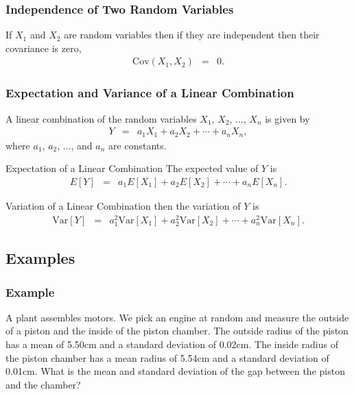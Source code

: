 \begin{frame}
  \frametitle{Independence of Two Random Variables}

    If $X_1$ and $X_2$ are random variables then if they are independent
    then their covariance is zero,
    \begin{eqnarray*}
      \mathrm{Cov}(X_1,X_2) & = & 0.
    \end{eqnarray*}
  
\end{frame}

\begin{frame}
  \frametitle{Expectation and Variance of a Linear Combination}

  A linear combination of the random variables $X_1$, $X_2$, $\ldots$,
  $X_n$ is given by
  \begin{eqnarray*}
    Y & = & a_1 X_1 + a_2 X_2 + \cdots + a_n X_n,
  \end{eqnarray*}
  where $a_1$, $a_2$, $\ldots$, and $a_n$ are constants.


  \begin{block}{Expectation of a Linear Combination}
    The expected value of $Y$ is 
    \begin{eqnarray*}
      E[Y] & = & a_1 E[X_1] + a_2 E[X_2] + \cdots + a_n E[X_n].
    \end{eqnarray*}
  \end{block}

  \begin{block}{Variation of a Linear Combination}
     then the
    variation of $Y$ is
    \begin{eqnarray*}
      \mathrm{Var}[Y] & = & a_1^2 \mathrm{Var}[X_1] + a_2^2 \mathrm{Var}[X_2] + \cdots + a_n^2 \mathrm{Var}[X_n].
    \end{eqnarray*}

  \end{block}

  
\end{frame}


\subsection{Examples}

\begin{frame}
  \frametitle{Example}
  A plant assembles motors. We pick an engine at random and measure
  the outside of a piston and the inside of the piston chamber. The
  outside radius of the piston has a mean of 5.50cm and a standard
  deviation of 0.02cm. The inside radius of the piston chamber has a
  mean radius of 5.54cm and a standard deviation of 0.01cm. What is
  the mean and standard deviation of the gap between the piston and
  the chamber?
\end{frame}

